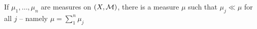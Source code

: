 \vs

\begin{prop}
If $\mu_1, \ldots, \mu_n$ are measures on $(X, \mathcal{M})$, there is a measure $\mu$ such that $\mu_j \ll \mu$ for all $j$ -- namely $\mu = \sum_1^n \mu_j$
\end{prop}




























